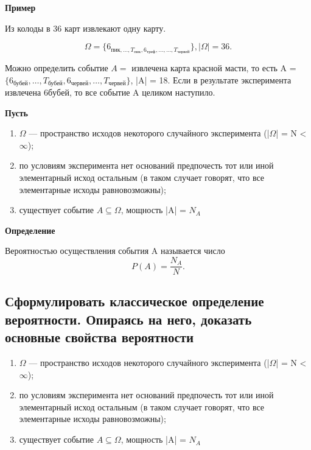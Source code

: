 \textbf{Пример}

Из колоды в 36 карт извлекают одну карту.

\begin{equation}
	\Omega = \{6_{\text{пик}, \dots, T_{\text{пик}}, 6_{\text{треф}}, \dots, \dots, T_{\text{червей}}}\}, |\Omega| = 36.
\end{equation} 

Можно определить событие $A = $ {извлечена карта красной масти}, то есть A = $\{6_{\text{бубей}}, \dots, T_{\text{бубей}}, 6_{\text{червей}}, \dots, T_{\text{червей}}  \}$, |A| = 18. Если в результате эксперимента извлечена $6 бубей$, то все событие A целиком наступило.

\textbf{Пусть}

\begin{enumerate}
	\item $\Omega$ --- пространство исходов некоторого случайного эксперимента (|$\Omega$| = N < $\infty$);
	\item по условиям эксперимента нет оснований предпочесть тот или иной элементарный исход остальным (в таком случает говорят, что все элементарные исходы равновозможны);
	\item существует событие $A \subseteq \Omega$, мощность |A| = $N_A$
\end{enumerate}

\textbf{Определение}

Вероятностью осуществления события A называется число 
\begin{equation}
	P(A) = \frac{N_A}{N}.
\end{equation}

\subsection{Сформулировать классическое определение вероятности. Опираясь на него, доказать основные свойства вероятности}

\begin{enumerate}
	\item $\Omega$ --- пространство исходов некоторого случайного эксперимента (|$\Omega$| = N < $\infty$);
	\item по условиям эксперимента нет оснований предпочесть тот или иной элементарный исход остальным (в таком случает говорят, что все элементарные исходы равновозможны);
	\item существует событие $A \subseteq \Omega$, мощность |A| = $N_A$
\end{enumerate}

